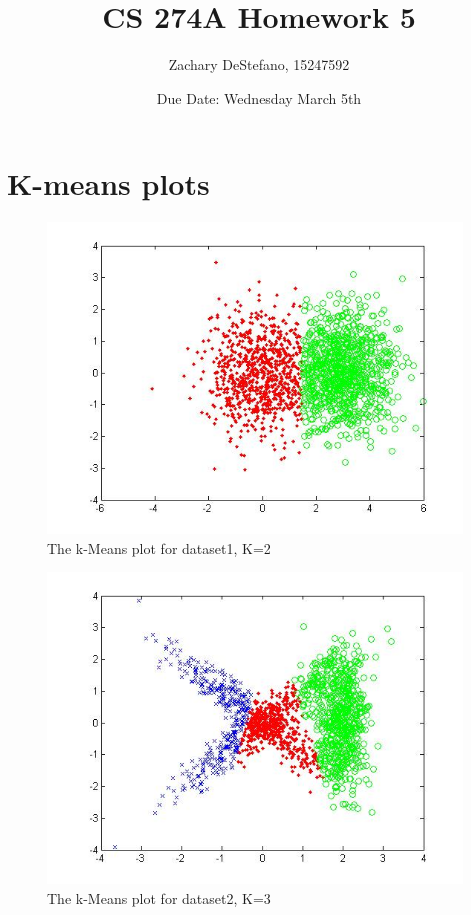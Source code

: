 \documentclass[11pt,psfig]{article}
\begin{document}
\setlength{\parskip}{1.2ex plus0.3ex minus 0.3ex}


\thispagestyle{empty} \pagestyle{myheadings} 



\title{CS 274A Homework 5}
\author{Zachary DeStefano, 15247592}
\date{Due Date: Wednesday March 5th}

\maketitle

 \newpage

\section*{K-means plots}

\begin{figure}[H]
\centering
\includegraphics[height=3.25in]{dataset1_kMeansPlot.jpg}
\caption{The k-Means plot for dataset1, K=2}
\end{figure}

\begin{figure}[H]
\centering
\includegraphics[height=3.25in]{dataset2_kMeansPlot.jpg}
\caption{The k-Means plot for dataset2, K=3}
\end{figure}
\end{document}

